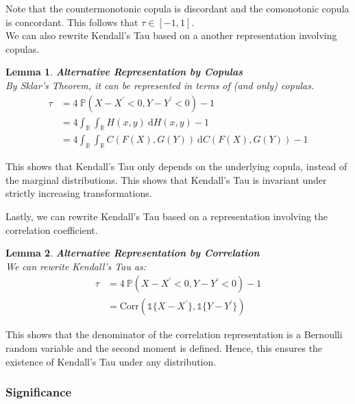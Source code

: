 \documentclass[12pt]{report}
\newtheorem{lemma}{Lemma}[subsection]
\newcommand{\1}{\mathbf{1}}
\begin{document}
Note that the countermonotonic copula is discordant and the comonotonic copula is concordant. This follows that $\tau \in [-1,1]$.\\
\vspace{0.5cm}
We can also rewrite Kendall's Tau based on a another representation involving copulas.\\

\begin{lemma}
\label{KendallTauGeneralizationCopulas}
\textit{\normalfont\parencite{HofertBook}}\:\textbf{Alternative Representation by Copulas}\\

By Sklar's Theorem, it can be represented in terms of (and only) copulas.
\begin{align*}
\tau &= 4 \: \mathbb{P} (X - X^{'} < 0, Y - Y^{'} < 0) - 1\\
&= 4 \int_{\mathbb{R}} \int_{\mathbb{R}} H(x,y) \: \mathrm{d}H(x,y) - 1 \\
&= 4 \int_{\mathbb{R}} \int_{\mathbb{R}} C(F(X),G(Y)) \: \mathrm{d}C(F(X),G(Y)) - 1
\end{align*}
\end{lemma}

This shows that Kendall's Tau only depends on the underlying copula, instead of the marginal distributions. This shows that Kendall's Tau is invariant under strictly increasing transformations.

Lastly, we can rewrite Kendall's Tau based on a representation involving the correlation coefficient. 

\begin{lemma}
\label{KendallTauGeneralizationCorrelation}
\textit{\normalfont\parencite{HofertBook}} \:\textbf{Alternative Representation by Correlation}\\
We can rewrite Kendall's Tau as:
\begin{align*}
\tau &= 4 \: \mathbb{P} (X - X^{'} < 0, Y - Y^{'} < 0) - 1\\
&= \mathrm{Corr} \left( \mathds{1}\{X - X^{'}\}, \mathds{1}\{Y - Y^{'}\} \right)
\end{align*}
\end{lemma}

This shows that the denominator of the correlation representation is a Bernoulli random variable and the second moment is defined. Hence, this ensures the existence of Kendall's Tau under any distribution.

\newpage
\subsubsection{Significance}
\end{document}
